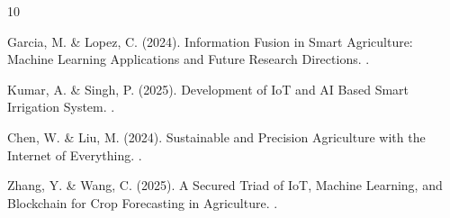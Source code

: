 \documentclass[12pt,a4paper]{article}
\begin{document}

\begin{thebibliography}{10}

Garcia, M. \& Lopez, C. (2024).
\newblock Information Fusion in Smart Agriculture: Machine Learning Applications and Future Research Directions.
.

Kumar, A. \& Singh, P. (2025).
\newblock Development of IoT and AI Based Smart Irrigation System.
.

Chen, W. \& Liu, M. (2024).
\newblock Sustainable and Precision Agriculture with the Internet of Everything.
.

Zhang, Y. \& Wang, C. (2025).
\newblock A Secured Triad of IoT, Machine Learning, and Blockchain for Crop Forecasting in Agriculture.
.

\end{thebibliography}
\end{document}
